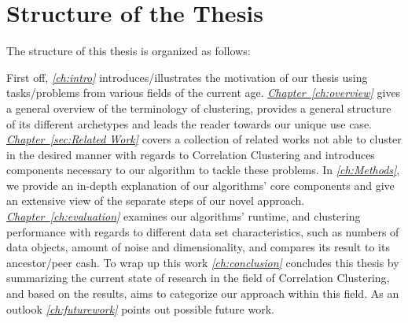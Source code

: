 \section{Structure of the Thesis}
The structure of this thesis is organized as follows:

First off, \textit{\autoref{ch:intro}} introduces/illustrates the motivation of our thesis using tasks/problems from various fields of the current age.
\textit{\hyperref[ch:overview]{Chapter~\ref*{ch:overview}}} gives a general overview of the terminology of clustering, provides a general structure of its different archetypes and leads the reader towards our unique use case.
\textit{\hyperref[sec:Related Work]{Chapter~\ref*{sec:Related Work}}} covers a collection of related works not able to cluster in the desired manner with regards to Correlation Clustering and introduces components necessary to our algorithm to tackle these problems.
In \textit{\autoref{ch:Methods}}, we provide an in-depth explanation of our algorithms' core components and give an extensive view of the separate steps of our novel approach.
\textit{\hyperref[ch:evaluation]{Chapter~\ref*{ch:evaluation}}} examines our algorithms' runtime, and clustering performance with regards to different data set characteristics, such as numbers of data objects, amount of noise and dimensionality, and compares its result to its ancestor/peer \acrshort{cash}.
To wrap up this work \textit{\autoref{ch:conclusion}} concludes this thesis by summarizing the current state of research in the field of Correlation Clustering, and based on the results, aims to categorize our approach within this field. As an outlook \textit{\autoref{ch:futurework}} points out possible future work.


